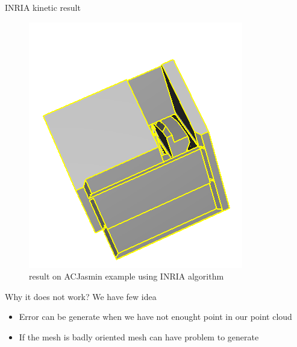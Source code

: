 \documentclass[10pt]{beamer}
\begin{document}
\begin{frame}{INRIA kinetic result }
\begin{figure}[H]
\begin{minipage}[t]{0.35\textwidth}
            \includegraphics[width=\textwidth]{../../images/screen_kinetic/ACJasmin_result_INRIA.png}
            \caption*{result}
          \end{minipage}
          \caption{result on ACJasmin example using INRIA algorithm}
      \end{figure}  
\end{frame}

\begin{frame}
    Why it does not work? We have few idea  
    \begin{itemize}
        \item Error can be generate when we have not enought point in our point cloud
        \item If the mesh is badly oriented mesh can have problem to generate
    \end{itemize}
\end{frame} 
\end{document}
